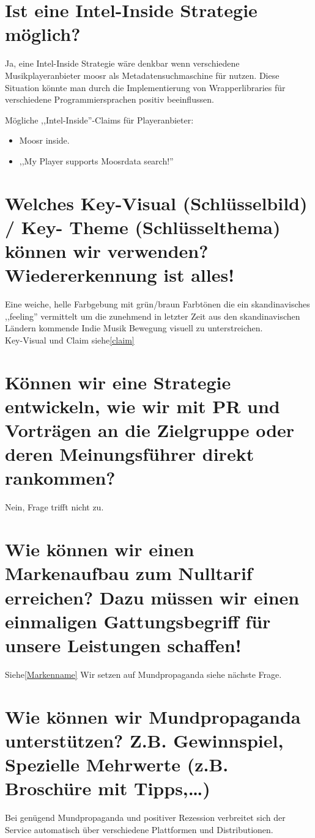 \documentclass[11pt]{scrreprt}
\begin{document}
\section{Ist eine Intel-Inside Strategie möglich?}
Ja, eine Intel-Inside Strategie wäre denkbar wenn verschiedene Musikplayeranbieter
moosr als Metadatensuchmaschine für nutzen. Diese Situation könnte man durch die
Implementierung von Wrapperlibraries für verschiedene Programmiersprachen
positiv beeinflussen.

Mögliche ,,Intel-Inside''-Claims für Playeranbieter:
\begin{itemize}
    \item Moosr inside.
    \item ,,My Player supports Moosrdata search!''
\end{itemize}


\section{Welches Key-Visual (Schlüsselbild) / Key-
    Theme (Schlüsselthema) können wir
verwenden? Wiedererkennung ist alles!}

Eine weiche, helle Farbgebung mit grün/braun Farbtönen die ein skandinavisches
,,feeling'' vermittelt um die zunehmend in letzter Zeit aus den skandinavischen
Ländern kommende Indie Musik Bewegung visuell zu  unterstreichen.
\\
Key-Visual und Claim siehe\ref{claim}


\section{Können wir eine Strategie entwickeln, wie wir
    mit PR und Vorträgen an die Zielgruppe oder
deren Meinungsführer direkt rankommen?}

Nein, Frage trifft nicht zu.

\section{Wie können wir einen Markenaufbau zum Nulltarif
    erreichen?
    Dazu müssen wir einen einmaligen Gattungsbegriff
für unsere Leistungen schaffen!}

Siehe\ref{Markenname} 
Wir setzen auf Mundpropaganda siehe nächste Frage.

\section{Wie können wir Mundpropaganda
    unterstützen?
    Z.B. Gewinnspiel, Spezielle Mehrwerte (z.B.
Broschüre mit Tipps,\dots)}
Bei genügend Mundpropaganda und positiver Rezession verbreitet sich der
Service automatisch über verschiedene Plattformen und Distributionen.
\end{document}
